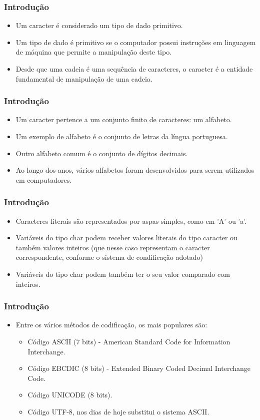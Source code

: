 \documentclass[aspectratio=169]{beamer}
\begin{document}
\begin{frame}
\frametitle{Introdução}
\begin{itemize}
\item Um caracter é considerado um tipo de dado primitivo.
\item Um tipo de dado é primitivo se o computador possui instruções em linguagem de máquina que permite a manipulação deste tipo.
\item Desde que uma cadeia é uma sequência de caracteres, o caracter é a entidade fundamental de manipulação de uma cadeia.
\end{itemize}
\end{frame}

\begin{frame}
\frametitle{Introdução}
\begin{itemize}
\item Um caracter pertence a um conjunto finito de caracteres: um alfabeto.
\item Um exemplo de alfabeto é o conjunto de letras da língua portuguesa.
\item Outro alfabeto comum é o conjunto de dígitos decimais.
\item Ao longo dos anos, vários alfabetos foram desenvolvidos para serem utilizados em computadores.
\end{itemize}
\end{frame}

\begin{frame}
\frametitle{Introdução}
\begin{itemize}
\item Caracteres literais são representados por aspas simples, como em 'A' ou 'a'.
\item Variáveis do tipo char podem receber valores literais do tipo caracter ou também valores inteiros (que nesse caso representam o caracter correspondente, conforme o sistema de condificação adotado)
\item Variáveis do tipo char podem também ter o seu valor comparado com inteiros.
\end{itemize}
\end{frame}


\begin{frame}
\frametitle{Introdução}
\begin{itemize}
\item Entre os vários métodos de codificação, os mais populares são:
  \begin{itemize}
    \item Código ASCII (7 bits) - American Standard Code for Information Interchange.
    \item Código EBCDIC (8 bits) - Extended Binary Coded Decimal Interchange Code.
    \item Código UNICODE (8 bits).
    \item Código UTF-8, nos dias de hoje substitui o sistema ASCII.
  \end{itemize}
\end{itemize}
\end{frame}
\end{document}
